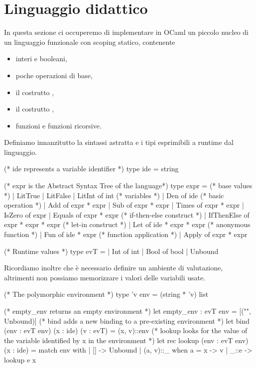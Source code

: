 \section{Linguaggio didattico}

In questa sezione ci occuperemo di implementare in OCaml un piccolo nucleo di un linguaggio funzionale con scoping statico, contenente
\begin{itemize}
    \item interi e booleani,
    \item poche operazioni di base,
    \item il costrutto ,
    \item il costrutto ,
    \item funzioni e funzioni ricorsive.
\end{itemize}

Definiamo innanzitutto la sintassi astratta e i tipi esprimibili a runtime dal linguaggio.

\begin{OCaml}
(* ide represents a variable identifier *)
type ide = string

(* expr is the Abstract Syntax Tree of the language*)
type expr = 
  (* base values *)
  | LitTrue
  | LitFalse
  | LitInt of int
  (* variables *)
  | Den of ide 
  (* basic operation *)
  | Add     of expr * expr
  | Sub     of expr * expr 
  | Times   of expr * expr
  | IsZero  of expr
  | Equals  of expr * expr
  (* if-then-else construct *)
  | IfThenElse of expr * expr * expr
  (* let-in construct *)
  | Let of ide * expr * expr
  (* anonymous function *)
  | Fun of ide * expr
  (* function application *)
  | Apply of expr * expr

(* Runtime values *)
type evT =
  | Int of int
  | Bool of bool
  | Unbound
\end{OCaml}

Ricordiamo inoltre che è necessario definire un ambiente di valutazione, altrimenti non possiamo memorizzare i valori delle variabili usate.

\begin{OCaml}
(* The polymorphic environment *)
type 'v env = (string * 'v) list

(* empty_env returns an empty environment *)
let empty_env : evT env = [("", Unbound)]
(* bind adds a new binding to a pre-existing environment *)
let bind (env : evT env) (x : ide) (v : evT) = (x, v)::env
(* lookup looks for the value of the variable identified by x in the environment *)
let rec lookup (env : evT env) (x : ide) = 
  match env with
  | []                    -> Unbound
  | (a, v)::_ when a = x  -> v
  | _::e                  -> lookup e x
\end{OCaml}

